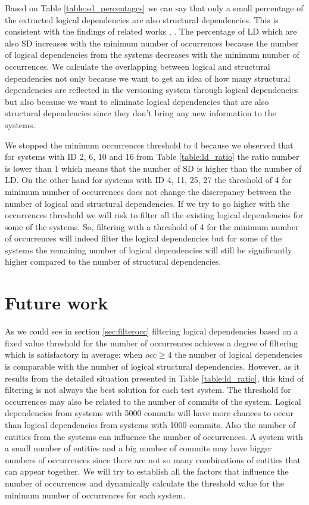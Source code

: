 \documentclass[conference]{IEEEtran}
\begin{document}
Based on Table \ref{table:sd_percentages} we can say that only a small percentage of the extracted logical dependencies are also structural dependencies. This is consistent with the findings of related works \cite{DBLP:journals/jss/AjienkaC17}, \cite{DBLP:journals/ese/AjienkaCC18}. The percentage of LD which are also SD  increases with the minimum number of occurrences because the number of logical dependencies from the systems decreases with the minimum number of occurrences. 
We calculate the overlapping between logical and structural dependencies not only because we want to get an idea of how many structural dependencies are reflected in the versioning system through logical dependencies but also because we want to eliminate logical dependencies that are also structural dependencies since they don't bring any new information to the systems.

We stopped the minimum occurrences threshold to 4 because we observed that for systems with ID 2, 6, 10 and 16 from Table \ref{table:ld_ratio} the ratio number is lower than 1 which means that the number of SD is higher than the number of LD. On the other hand for systems with ID 4, 11, 25, 27 the threshold of 4 for minimum number of occurrences does not change the discrepancy between the number of logical and structural dependencies.
If we try to go higher with the occurrences threshold we will risk to filter all the existing logical dependencies for some of the systems.
So, filtering with a threshold of 4 for the minimum number of occurrences will indeed filter the logical dependencies but for some of the systems the remaining number of logical dependencies will still be significantly higher compared to the number of structural dependencies.



\section{Future work}
\label{sec:future}
As we could see in section \ref{sec:filterocc} filtering logical dependencies based on a fixed value threshold for the number of occurrences achieves a degree of filtering which is satisfactory in average: when $occ\geq 4$ the number of logical dependencies is comparable with the number of logical structural dependencies. However, as it results from the detailed situation presented in Table \ref{table:ld_ratio}, this kind of filtering is not always the best solution for each test system.
The threshold for occurrences may also be related to the number of commits of the system. Logical dependencies from systems with 5000 commits will have more chances to occur than logical dependencies from systems with 1000 commits. Also the number of entities from the systems can influence the number of occurrences. A system with a small number of entities and a big number of commits may have bigger numbers of occurrences since there are not so many combinations of entities that can appear together.
We will try to establish all the factors that influence the number of occurrences and dynamically calculate the threshold value for the minimum number of occurrences for each system.
\end{document}
